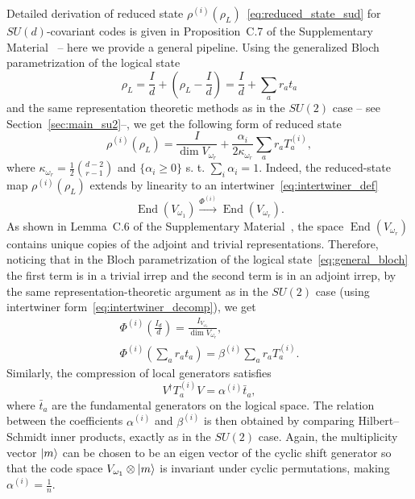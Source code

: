 \documentclass[10pt,twocolumn,superscriptaddress,aps,amsmath,amssymb,citeautoscript,floatfix,prx,longbibliography]{revtex4-2}
\theoremstyle{plain}
\theoremstyle{plain}
\theoremstyle{plain}
\theoremstyle{plain}
\theoremstyle{plain}
\theoremstyle{plain}
\begin{document}
Detailed derivation of reduced state $\rho^{(i)}(\rho_L)$~\eqref{eq:reduced_state_sud} for $SU(d)$-covariant codes is given in Proposition~C.7 of the Supplementary Material~\cite{SuppMat} -- here we provide a general pipeline. Using the generalized Bloch parametrization of the logical state 
\begin{equation}\label{eq:general_bloch}
\rho_L=\frac{I}{d}+\left(\rho_L-\frac{I}{d}\right)=\frac{I}{d}+\sum_a r_a t_a
\end{equation}
and the same representation theoretic methods as in the $SU(2)$ case -- see Section~\ref{sec:main_su2}--, we get the following form of reduced state
\begin{equation}\label{eq:reduced_state_sud}
    \rho^{(i)}\left(\rho_L\right) = \frac{I}{\operatorname{dim} V_{\omega_r}}+\frac{\alpha_i}{2 \kappa_{\omega_r}} \sum_a r_a T_a^{(i)},
\end{equation}
where $\kappa_{\omega_r}=\frac{1}{2}\binom{d-2}{r-1}$ and $\{\alpha_i\geq 0\}$ s. t. $\sum_i\alpha_i=1$.
Indeed, the reduced-state map \(\rho^{(i)}(\rho_L)\) extends by linearity to an intertwiner~\eqref{eq:intertwiner_def}
\[
    \operatorname{End}(V_{\omega_1})
    \xrightarrow{\Phi^{(i)}}
    \operatorname{End}(V_{\omega_r}).
\]
As shown in Lemma~C.6 of the Supplementary Material~\cite{SuppMat}, the space \(\operatorname{End}(V_{\omega_r})\) contains unique copies of the adjoint and trivial representations. Therefore, noticing that in the Bloch parametrization of the logical state~\eqref{eq:general_bloch} the first term is in a trivial irrep and the second term is in an adjoint irrep, by the same representation-theoretic argument as in the \(SU(2)\) case (using intertwiner form~\eqref{eq:intertwiner_decomp}), we get
\begin{equation}\label{eq:linear_ext_of_red_state}
\begin{gathered}
        \Phi^{(i)}\left(\frac{I_d}{d}\right)=\frac{I_{V_{\omega_r}}}{\operatorname{dim} V_{\omega_r}},\\
        \Phi^{(i)}\left(\sum_a r_a t_a\right)=\beta^{(i)}\sum_a r_a T_a^{(i)}.
\end{gathered}
\end{equation}
Similarly, the compression of local generators satisfies
\[
    V^\dagger T_a^{(i)}V=\alpha^{(i)} \bar{t}_a,
\]
where \(\bar{t}_a\) are the fundamental generators on the logical space. The relation between the coefficients \(\alpha^{(i)}\) and \(\beta^{(i)}\) is then obtained by comparing Hilbert--Schmidt inner products, exactly as in the \(SU(2)\) case.
Again, the multiplicity vector $\ket{m}$ can be chosen to be an eigen vector of the cyclic shift generator so that the code space $V_{\omega_1}\otimes \ket{m}$ is invariant under cyclic permutations, making $\alpha^{(i)}=\frac{1}{n}$.
\end{document}
